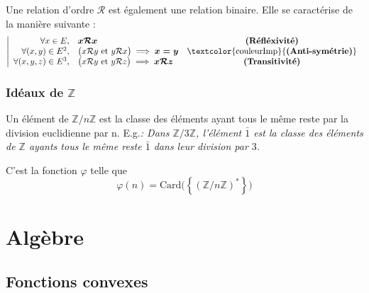 \documentclass[11pt,a4paper,fleqn,pdftex]{report}
\begin{document}
\begin{dfn}
Une relation d'ordre $\mathcal{R}$ est également une relation binaire. Elle se caractérise de la manière suivante : 
\begin{equation}
\left|
\begin{array}{r l c}
\forall x \in E,& \boldsymbol{x\mathcal{R}x} & \text{\textbf{(Réfléxivité)}}\\
\forall (x,y) \in E^2, & \big( x\mathcal{R}y \text{ et } y\mathcal{R}x \big) \implies \boldsymbol{x=y} & \text{\textcolor{couleurImp}{\textbf{(Anti-symétrie)}}}\\
\forall (x,y,z) \in E^3, & \big( x\mathcal{R}y \text{ et } y\mathcal{R}z \big) \implies \boldsymbol{x\mathcal{R}z} & \text{\textbf{(Transitivité)}}
\end{array}
\right.
\end{equation}
\end{dfn}


\section{Idéaux de $\mathbb{Z}$}
\begin{dfn}
Un élément de $\mathbb{Z}/ n\mathbb{Z}$ est la classe des éléments ayant tous le même reste par la division euclidienne par n.\newline
E.g.\textit{: Dans $\mathbb{Z}/3\mathbb{Z}$, l'élément $\bar{1}$ est la classe des éléments de $\mathbb{Z}$ ayants tous le même reste $\bar{1}$ dans leur division par $3$.}
\end{dfn}


\begin{theorem}
C'est la fonction $\varphi$ telle que 
\[
    \varphi (n) = \mathrm{Card}\big( \left\lbrace \left( \mathbb{Z} / n \mathbb{Z} \right) ^{*} \right\rbrace \big)
\]
\end{theorem}

\part{Algèbre}
\chapter{Fonctions convexes} %
\label{cha:fonctions_convexes}
\end{document}
